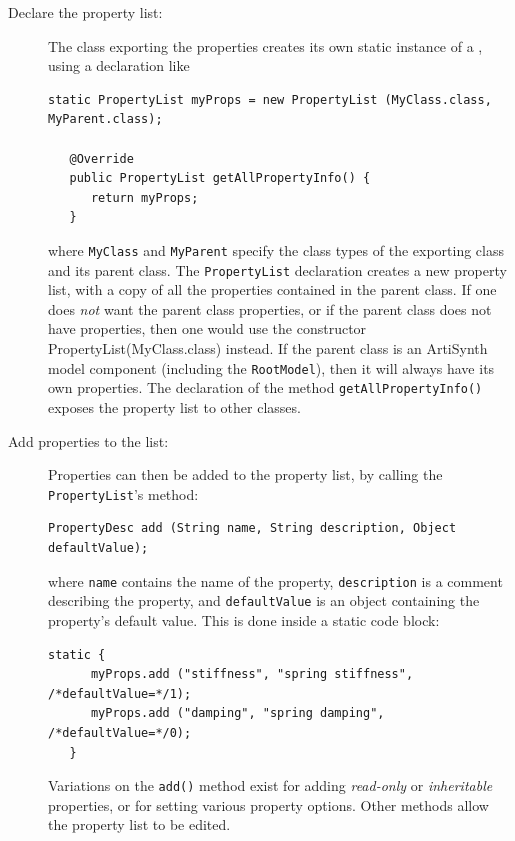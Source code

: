 \begin{description}

\item[Declare the property list:]\mbox{}

The class exporting the properties creates its own static instance of
a , using a declaration
like
%
\begin{lstlisting}[]
   static PropertyList myProps = new PropertyList (MyClass.class, MyParent.class);

   @Override   
   public PropertyList getAllPropertyInfo() {
      return myProps;
   }  
\end{lstlisting}
%
where {\tt MyClass} and {\tt MyParent} specify the class types of the
exporting class and its parent class. The {\tt PropertyList}
declaration creates a new property list, with a copy of all the
properties contained in the parent class.  If one does {\it not} want
the parent class properties, or if the parent class does not have
properties, then one would use the constructor
%
{PropertyList(MyClass.class)} instead. If the parent class is an
ArtiSynth model component (including the {\tt RootModel}), then it
will always have its own properties. The declaration of the method
{\tt getAllPropertyInfo()} exposes the property list to other classes.

\item[Add properties to the list:]\mbox{}

Properties can then be added to the property list, by calling the {\tt
PropertyList}'s
method:
\begin{lstlisting}[]
   PropertyDesc add (String name, String description, Object defaultValue);
\end{lstlisting}
%
where {\tt name} contains the name of the property, {\tt description}
is a comment describing the property, and {\tt defaultValue} is an
object containing the property's default value.  This is done inside a
static code block:
%
\begin{lstlisting}[]
   static {
      myProps.add ("stiffness", "spring stiffness", /*defaultValue=*/1);
      myProps.add ("damping", "spring damping", /*defaultValue=*/0);
   }
\end{lstlisting}
%
Variations on the {\tt add()} method exist for adding {\it read-only}
or {\it inheritable} properties, or for setting various property
options. Other methods allow the property list to be edited.


\end{description}

